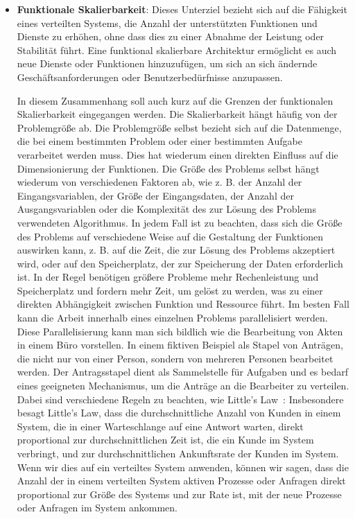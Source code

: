 \documentclass[../vs-script-first-v01.tex]{subfiles}
\begin{document}
\begin{itemize}
  \item \textbf{Funktionale Skalierbarkeit}: Dieses Unterziel bezieht sich auf die Fähigkeit eines verteilten Systems, die Anzahl der unterstützten Funktionen und Dienste zu erhöhen, ohne dass dies zu einer Abnahme der Leistung oder Stabilität führt. Eine funktional skalierbare Architektur ermöglicht es auch neue Dienste oder Funktionen hinzuzufügen, um sich an sich ändernde Geschäftsanforderungen oder Benutzerbedürfnisse anzupassen.

        In diesem Zusammenhang soll auch kurz auf die Grenzen der funktionalen Skalierbarkeit eingegangen werden. Die Skalierbarkeit hängt häufig von der Problemgröße ab. Die Problemgröße selbst bezieht sich auf die Datenmenge, die bei einem bestimmten Problem oder einer bestimmten Aufgabe verarbeitet werden muss. Dies hat wiederum einen direkten Einfluss auf die Dimensionierung der Funktionen. Die Größe des Problems selbst hängt wiederum von verschiedenen Faktoren ab, wie z. B. der Anzahl der Eingangsvariablen, der Größe der Eingangsdaten, der Anzahl der Ausgangsvariablen oder die Komplexität des zur Lösung des Problems verwendeten Algorithmus. In jedem Fall ist zu beachten, dass sich die Größe des Problems auf verschiedene Weise auf die Gestaltung der Funktionen auswirken kann, z. B. auf die Zeit, die zur Lösung des Problems akzeptiert wird, oder auf den Speicherplatz, der zur Speicherung der Daten erforderlich ist. In der Regel benötigen größere Probleme mehr Rechenleistung und Speicherplatz und fordern mehr Zeit, um gelöst zu werden, was zu einer direkten Abhängigkeit zwischen Funktion und Ressource führt. Im besten Fall kann die Arbeit innerhalb eines einzelnen Problems parallelisiert werden. Diese Parallelisierung kann man sich bildlich wie die Bearbeitung von Akten in einem Büro vorstellen. In einem fiktiven Beispiel als Stapel von Anträgen, die nicht nur von einer Person, sondern von mehreren Personen bearbeitet werden. Der Antragsstapel dient als Sammelstelle für Aufgaben und es bedarf eines geeigneten Mechanismus, um die Anträge an die Bearbeiter zu verteilen. Dabei sind verschiedene Regeln zu beachten, wie Little's Law~\cite{little1961proof}:
        Insbesondere besagt Little's Law, dass die durchschnittliche Anzahl von Kunden in einem System, die in einer Warteschlange auf eine Antwort warten, direkt proportional zur durchschnittlichen Zeit ist, die ein Kunde im System verbringt, und zur durchschnittlichen Ankunftsrate der Kunden im System. Wenn wir dies auf ein verteiltes System anwenden, können wir sagen, dass die Anzahl der in einem verteilten System aktiven Prozesse oder Anfragen direkt proportional zur Größe des Systems und zur Rate ist, mit der neue Prozesse oder Anfragen im System ankommen.


\end{itemize}
\end{document}
